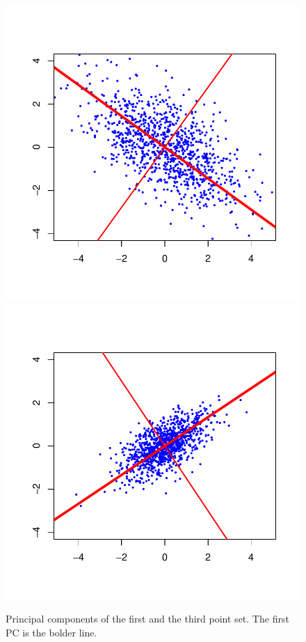 \documentclass{article}
\begin{document}
\begin{figure} \centering
	\includegraphics[scale=\sscale]{pcadir1}
	\includegraphics[scale=\sscale]{pcadir3}
	\caption{Principal components of the first and the third point set. The first PC is the bolder line.} \label{fig:pcadir}
\end{figure}
\end{document}
